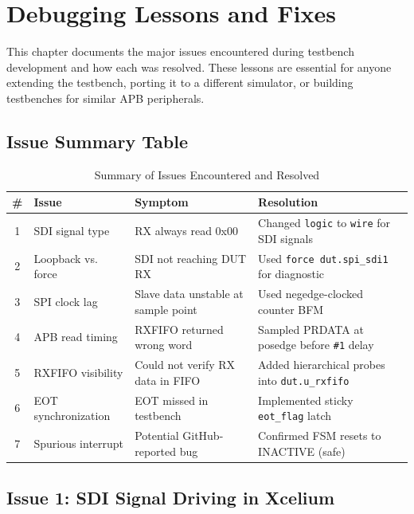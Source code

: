 \chapter{Debugging Lessons and Fixes}
\label{ch:debugging}

This chapter documents the major issues encountered during testbench development and how each
was resolved. These lessons are essential for anyone extending the testbench, porting it to a
different simulator, or building testbenches for similar APB peripherals.

\section{Issue Summary Table}

\begin{table}[H]
\centering
\caption{Summary of Issues Encountered and Resolved}
\label{tab:issues}
\small
\begin{tabularx}{\textwidth}{@{}clXX@{}}
\toprule
\textbf{\#} & \textbf{Issue} & \textbf{Symptom} & \textbf{Resolution} \\
\midrule
1 & SDI signal type & RX always read 0x00 & Changed \texttt{logic} to \texttt{wire} for SDI signals \\
2 & Loopback vs. force & SDI not reaching DUT RX & Used \texttt{force dut.spi\_sdi1} for diagnostic \\
3 & SPI clock lag & Slave data unstable at sample point & Used negedge-clocked counter BFM \\
4 & APB read timing & RXFIFO returned wrong word & Sampled PRDATA at posedge before \texttt{\#1} delay \\
5 & RXFIFO visibility & Could not verify RX data in FIFO & Added hierarchical probes into \texttt{dut.u\_rxfifo} \\
6 & EOT synchronization & EOT missed in testbench & Implemented sticky \texttt{eot\_flag} latch \\
7 & Spurious interrupt & Potential GitHub-reported bug & Confirmed FSM resets to INACTIVE (safe) \\
\bottomrule
\end{tabularx}
\end{table}

\section{Issue 1: SDI Signal Driving in Xcelium}

